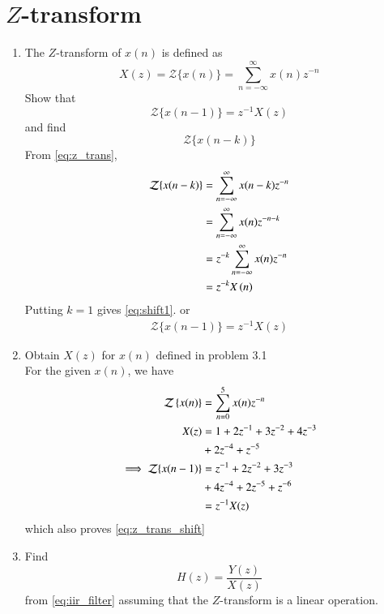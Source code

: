 \documentclass[journal,12pt,twocolumn]{IEEEtran}
\renewcommand\thesection{\arabic{section}}
\begin{document}
\section{$Z$-transform}
\begin{enumerate}[label=\thesection.\arabic*]
\item The $Z$-transform of $x(n)$ is defined as
\begin{equation}
\label{eq:z_trans}
X(z)={\mathcal {Z}}\{x(n)\}=\sum _{n=-\infty }^{\infty }x(n)z^{-n}
\end{equation}
Show that
\begin{equation}
\label{eq:shift1}
{\mathcal {Z}}\{x(n-1)\} = z^{-1}X(z)
\end{equation}
and find
\begin{equation}
	{\mathcal {Z}}\{x(n-k)\} 
\end{equation}
\solution From \eqref{eq:z_trans},
\begin{align}
{\mathcal {Z}}\{x(n-k)\} &=\sum _{n=-\infty }^{\infty }x(n-k)z^{-n}\\
&=\sum _{n=-\infty }^{\infty }x(n)z^{-n-k} \\
&= z^{-k}\sum _{n=-\infty }^{\infty }x(n)z^{-n} \\
&= z^{-k}X\left(n\right)
\label{eq:z_trans_shift}
\end{align}
Putting $k = 1$ gives \eqref{eq:shift1}. or
\begin{align}
	{\mathcal {Z}}\{x(n-1)\} =  z^{-1}X(z)
\end{align}
\item Obtain $X(z)$ for $x(n)$ defined in problem 
	3.1 \\
\solution For the given $x(n)$, we have
\begin{align}
	\mathcal{Z} \left\{x(n)\right\} &= \sum_{n=0}^5x(n)z^{-n} \\
	X(z) &= 1 + 2z^{-1} + 3z^{-2} + 4z^{-3} \nonumber \\
		&+ 2z^{-4} + z^{-5} \\
	\implies {\mathcal {Z}}\{x(n-1)\} &= z^{-1} + 2z^{-2} + 3z^{-3} \nonumber \\
									  &+4z^{-4} + 2z^{-5} + z^{-6} \\
	&= z^{-1}X(z)
\end{align}	
which also proves \ref{eq:z_trans_shift}
\item Find
\begin{equation}
H(z) = \frac{Y(z)}{X(z)}
\end{equation}
from  \eqref{eq:iir_filter} assuming that the $Z$-transform is a linear operation.


\end{enumerate}
\end{document}
